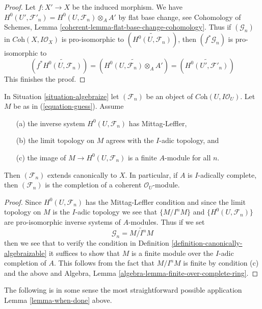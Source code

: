 \begin{proof}
Let $f : X' \to X$ be the induced morphism.
We have $H^0(U', \mathcal{F}'_n) = H^0(U, \mathcal{F}_n) \otimes_A A'$ by
flat base change, see Cohomology of Schemes, Lemma
\ref{coherent-lemma-flat-base-change-cohomology}.
Thus if $(\mathcal{G}_n)$ in $\textit{Coh}(X, I\mathcal{O}_X)$
is pro-isomorphic to $(\widetilde{H^0(U, \mathcal{F}_n)})$, then
$(f^*\mathcal{G}_n)$ is pro-isomorphic to
$$
(f^*\widetilde{H^0(U, \mathcal{F}_n)}) =
(\widetilde{H^0(U, \mathcal{F}_n) \otimes_A A'}) =
(\widetilde{H^0(U', \mathcal{F}'_n)})
$$
This finishes the proof.
\end{proof}

\begin{lemma}
\label{lemma-when-done}
In Situation \ref{situation-algebraize} let $(\mathcal{F}_n)$ be an object
of $\textit{Coh}(U, I\mathcal{O}_U)$. Let $M$ be as in (\ref{equation-guess}).
Assume
\begin{enumerate}
\item[(a)] the inverse system $H^0(U, \mathcal{F}_n)$ has Mittag-Leffler,
\item[(b)] the limit topology on $M$ agrees with the $I$-adic topology, and
\item[(c)] the image of $M \to H^0(U, \mathcal{F}_n)$ is a finite $A$-module
for all $n$.
\end{enumerate}
Then $(\mathcal{F}_n)$ extends canonically to $X$.
In particular, if $A$ is $I$-adically complete, then
$(\mathcal{F}_n)$ is the completion of a coherent $\mathcal{O}_U$-module.
\end{lemma}

\begin{proof}
Since $H^0(U, \mathcal{F}_n)$ has the Mittag-Leffler condition
and since the limit topology on $M$ is the $I$-adic topology
we see that $\{M/I^nM\}$ and $\{H^0(U, \mathcal{F}_n)\}$
are pro-isomorphic inverse systems of $A$-modules.
Thus if we set
$$
\mathcal{G}_n = \widetilde{M/I^n M}
$$
then we see that to verify the condition in
Definition \ref{definition-canonically-algebraizable}
it suffices to show that $M$ is a finite module over the
$I$-adic completion of $A$. This follows from
the fact that $M/I^n M$ is finite by condition (c)
and the above and
Algebra, Lemma \ref{algebra-lemma-finite-over-complete-ring}.
\end{proof}

\noindent
The following is in some sense the most straightforward possible application
Lemma \ref{lemma-when-done} above.

